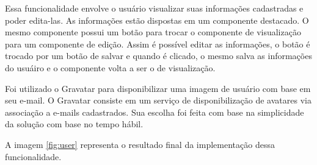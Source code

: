 Essa funcionalidade envolve o usuário visualizar suas informações cadastradas e poder edita-las. As informações estão dispostas em um componente destacado. O mesmo componente possui um botão para trocar o componente de visualização para um componente de edição. Assim é possível editar as informações, o botão é trocado por um botão de salvar e quando é clicado, o mesmo salva as informações do usuáiro e o componente volta a ser o de visualização.

Foi utilizado o Gravatar para disponibilizar uma imagem de usuário com base em seu e-mail. O Gravatar consiste em um serviço de disponibilização de avatares via associação a e-mails cadastrados. Sua escolha foi feita com base na simplicidade da solução com base no tempo hábil.

A imagem \ref{fig:user} representa o resultado final da implementação dessa funcionalidade.

